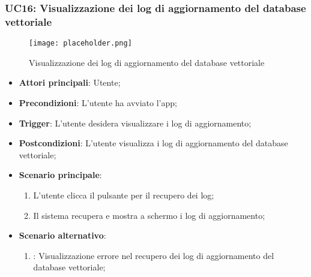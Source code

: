 \hypertarget{UC16}{}
\subsubsection{UC16: Visualizzazione dei log di aggiornamento del database vettoriale}

\begin{figure}[h]
    \centering
    \texttt{[image: placeholder.png]}
    \caption{Visualizzazione dei log di aggiornamento del database vettoriale}
\end{figure}


\begin{itemize}
    \item \textbf{Attori principali}: Utente;
    \item \textbf{Precondizioni}: L'utente ha avviato l'app;
    \item \textbf{Trigger}: L'utente desidera visualizzare i log di aggiornamento;
    \item \textbf{Postcondizioni}: L'utente visualizza i log di aggiornamento del database vettoriale;
    \item \textbf{Scenario principale}:
    \begin{enumerate}
        \item L'utente clicca il pulsante per il recupero dei log;
        \item Il sistema recupera e mostra a schermo i log di aggiornamento;
    \end{enumerate}
    \item \textbf{Scenario alternativo}:
    \begin{enumerate}
        \item {}: Visualizzazione errore nel recupero dei log di aggiornamento del database vettoriale;
    \end{enumerate}
\end{itemize}

\hypertarget{UC17}{}
